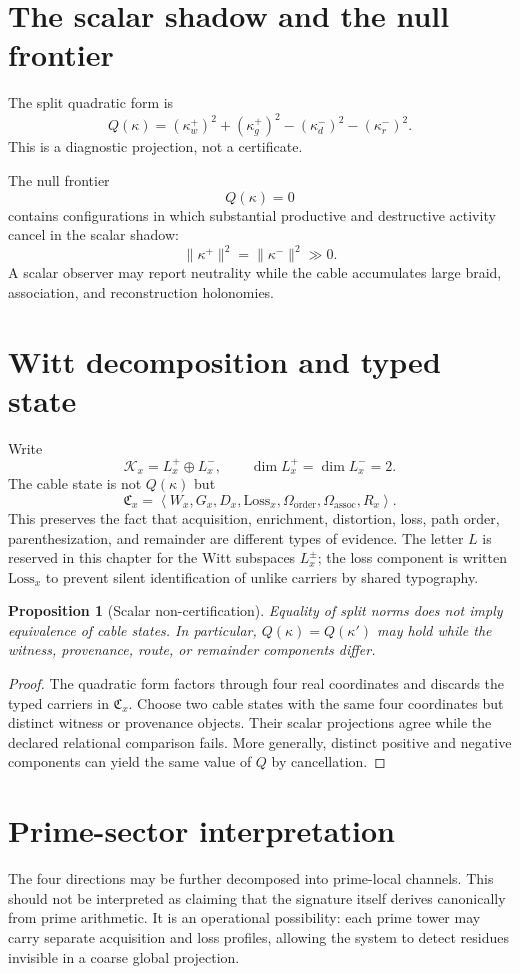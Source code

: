 \documentclass[12pt,openany]{book}
\newtheorem{proposition}[definition]{Proposition}
\theoremstyle{remark}
\newcommand{\typedtuple}[1]{\left\langle #1 \right\rangle}
\begin{document}
\section{The scalar shadow and the null frontier}
The split quadratic form is
\[
Q(\kappa)
=(\kappa_w^+)^2+(\kappa_g^+)^2-(\kappa_d^-)^2-(\kappa_r^-)^2.
\]
This is a diagnostic projection, not a certificate.

The null frontier
\[
Q(\kappa)=0
\]
contains configurations in which substantial productive and destructive activity cancel in the scalar shadow:
\[
\|\kappa^+\|^2=\|\kappa^-\|^2\gg0.
\]
A scalar observer may report neutrality while the cable accumulates large braid, association, and reconstruction holonomies.

\section{Witt decomposition and typed state}
Write
\[
\mathcal K_x=L_x^+\oplus L_x^-,
\qquad
\dim L_x^+=\dim L_x^-=2.
\]
The cable state is not $Q(\kappa)$ but
\[
\mathfrak C_x=
\typedtuple{
W_x,G_x,D_x,\mathrm{Loss}_x,
\Omega_{\mathrm{order}},
\Omega_{\mathrm{assoc}},
R_x
}.
\]
This preserves the fact that acquisition, enrichment, distortion, loss, path order, parenthesization, and remainder are different types of evidence. The letter $L$ is reserved in this chapter for the Witt subspaces $L_x^{\pm}$; the loss component is written $\mathrm{Loss}_x$ to prevent silent identification of unlike carriers by shared typography.

\begin{proposition}[Scalar non-certification]
Equality of split norms does not imply equivalence of cable states. In particular, $Q(\kappa)=Q(\kappa')$ may hold while the witness, provenance, route, or remainder components differ.
\end{proposition}

\begin{proof}
The quadratic form factors through four real coordinates and discards the typed carriers in $\mathfrak C_x$. Choose two cable states with the same four coordinates but distinct witness or provenance objects. Their scalar projections agree while the declared relational comparison fails. More generally, distinct positive and negative components can yield the same value of $Q$ by cancellation.
\end{proof}

\section{Prime-sector interpretation}
The four directions may be further decomposed into prime-local channels. This should not be interpreted as claiming that the signature itself derives canonically from prime arithmetic. It is an operational possibility: each prime tower may carry separate acquisition and loss profiles, allowing the system to detect residues invisible in a coarse global projection.
\end{document}
